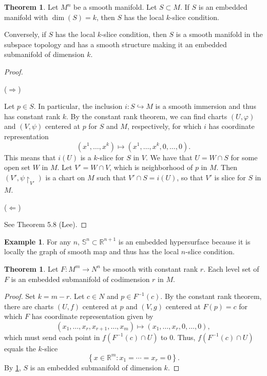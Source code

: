 \documentclass[10pt,letterpaper,cm]{nupset}
\theoremstyle{definition}
\newtheorem{exmp}[definition]{Example}
\theoremstyle{theorem}
\newtheorem{theorem}[definition]{Theorem}
\theoremstyle{remark}
\newcommand{\R}{\mathbb R}
\renewcommand{\S}{\mathbb S}
\newcommand{\1}{\mathbf{1}}
\newcommand{\0}{\vec 0}
\begin{document}
\begin{theorem}\label{slice}
Let $M^n$ be a smooth manifold. Let  $S\subset M$. If $S$ is an embedded manifold with $\dim(S) = k$, then $S$ has the local $k$-slice condition. 

Conversely, if $S$ has the local $k$-slice condition, then $S$ is a smooth manifold in the subspace topology and has a smooth structure making it an embedded submanifold of dimension $k$.
\end{theorem}
\begin{proof}$ $
\smallskip

($\Longrightarrow$)

Let $p\in S$. In particular, the inclusion $i : S\hookrightarrow M$ is a smooth immersion and thus has constant rank $k$. By the constant rank theorem, we can find charts $\left(U, \varphi\right)$ and $\left(V, \psi\right)$ centered at $p$ for $S$ and $M$, respectively, for which $i$ has coordinate representation
\[
\left(x^1, \ldots, x^k\right) \mapsto \left(x^1, \ldots, x^k, 0, \ldots, 0\right).
\] This means that $ i(U)$ is a $k$-slice for $S$ in $V$. We have that $U = W  \cap S$ for some open set $W$ in $M$. Let $V' = W \cap V$, which is neighborhood of $p$ in  $M$. Then  $\left(V', \psi\restriction_{V'}\right)$ is a chart on $M$ such that $V' \cap S = i(U)$, so that $V'$ is slice for $S$ in $M$.

\medskip

($\Longleftarrow$)

See Theorem 5.8 (Lee).

\end{proof}

\begin{exmp}
For any $n$, $\S^n \subset \R^{n+1}$ is an embedded hypersurface because it is locally the graph of smooth map and thus has the local $n$-slice condition.
\end{exmp}

\begin{theorem}\label{lset}
Let $F: M^m \to N^n$ be smooth with constant rank $r$. Each level set of $F$ is an embedded submanifold of codimension $r$ in $M$.
\end{theorem}
\begin{proof}
Set $k = m -r$. Let $c \in N$ and $p \in F^{-1}(c)$. By the constant rank theorem, there are charts $\left(U, f\right)$ centered at $p$ and $\left(V, g\right)$ centered at $F(p) = c$ for which $F$ has coordinate representation given by $$\left(x_1, \ldots, x_r, x_{r+1}, \ldots, x_m\right) \mapsto \left(x_1, \ldots, x_r, 0, \ldots, 0\right),$$ which must send each point in $f(F^{-1}(c) \cap U)$ to $0$.  Thus, $f(F^{-1}(c) \cap U)$ equals the $k$-slice $$\left\{x \in \R^m : x_1 = \cdots = x_r = 0\right\}.$$ By \cref{slice}, $S$ is an embedded submanifold of dimension $k$.
\end{proof}
\end{document}
